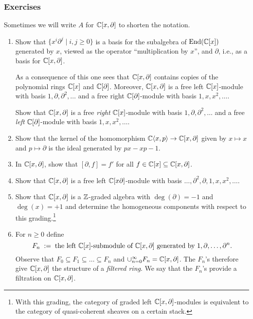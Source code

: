 \documentclass[12pt]{article}
\begin{document}
\subsubsection{Exercises}
Sometimes we will write $A$ for $\mathbb{C}[x,\partial]$ to shorten the notation.

\begin{enumerate}
  \item 
  Show that  $\{x^i\partial^j \; | \; i,j \ge 0\}$ is a basis for  the subalgebra of $\operatorname{End}(\mathbb{C}[x])$ generated by $x$, viewed as the operator ``multiplication by $x$'', and $\partial$, i.e., as a basis for $\mathbb{C}[x,\partial]$.
  
  
  As a consequence of this one sees that $\mathbb{C}[x,\partial]$ contains copies of the polynomial rings $\mathbb{C}[x]$ and $\mathbb{C}[\partial]$.
  Moreover, $\mathbb{C}[x,\partial]$ is a free left $\mathbb{C}[x]$-module with basis $1,\partial,\partial^2,\ldots$ and 
  a free right $\mathbb{C}[\partial]$-module with basis $1,x,x^2,\ldots$.
  
  Show that $\mathbb{C}[x,\partial]$ is a free {\it right} $\mathbb{C}[x]$-module with basis $1,\partial,\partial^2,\ldots$ and 
  a free {\it left} $\mathbb{C}[\partial]$-module with basis $1,x,x^2,\ldots$.
  \item 
 Show that the kernel of the homomorphism  $\mathbb{C}\langle x,p \rangle \to \mathbb{C}[x,\partial]$ given by $x \mapsto x$ and $p \mapsto \partial$
 is the ideal generated by $px-xp-1$.
  \item 
In  $\mathbb{C}[x,\partial]$, show that $[\partial,f]=f'$ for all $f \in \mathbb{C}[x] \subseteq  \mathbb{C}[x,\partial]$.
\item
Show that $\mathbb{C}[x,\partial]$ is a free left $\mathbb{C}[x\partial]$-module with basis $\ldots,\partial^2,\partial,1,x,x^2,\ldots$.
\item
\label{ex.grading}
Show that $\mathbb{C}[x,\partial]$ is a $\mathbb{Z}$-graded algebra with $\deg(\partial)=-1$ and $\deg(x)=+1$ and determine the homogeneous
components with respect to this grading.\footnote{With this grading, the category of graded left $\mathbb{C}[x,\partial]$-modules is
equivalent to the category of quasi-coherent sheaves on a certain stack.}
\item
For $n \ge 0$ define 
$$
F_n \; :=\; \text{the left $\mathbb{C}[x]$-submodule of $\mathbb{C}[x,\partial]$ generated by $1,\partial,\ldots,\partial^n$}.
$$
Observe that $F_0 \subseteq F_1\subseteq \ldots \subseteq F_n$ and $\cup_{n=0}^\infty F_n = \mathbb{C}[x,\partial]$.
The $F_n$'s therefore give $\mathbb{C}[x,\partial]$ the structure of a {\it filtered ring}. We say that the $F_n$'s provide 
a {\sf filtration} on $\mathbb{C}[x,\partial]$.


\end{enumerate}
\end{document}
